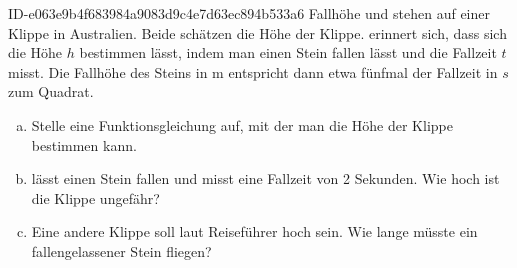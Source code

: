 \begin{exercise}
      {ID-e063e9b4f683984a9083d9c4e7d63ec894b533a6}
      {Fallhöhe}
  \ifproblem\problem
    \xya{} und \xyb{} stehen auf einer Klippe in Australien. Beide schätzen
    die Höhe der Klippe. \xya{} erinnert sich, dass sich die Höhe $h$ bestimmen
    lässt, indem man einen Stein fallen lässt und die Fallzeit $t$ misst. Die
    Fallhöhe des Steins in m entspricht dann etwa fünfmal der Fallzeit in
    $s$ zum Quadrat.
    \begin{enumerate}[a)]
      \item Stelle eine Funktionsgleichung auf, mit der man die Höhe der Klippe
            bestimmen kann.
      \item \xya{} lässt einen Stein fallen und \xyb{} misst eine Fallzeit
            von 2 Sekunden. Wie hoch ist die Klippe ungefähr?
      \item Eine andere Klippe soll laut Reiseführer  hoch sein.
            Wie lange müsste ein fallengelassener Stein fliegen?
    \end{enumerate}
  \fi
\end{exercise}
